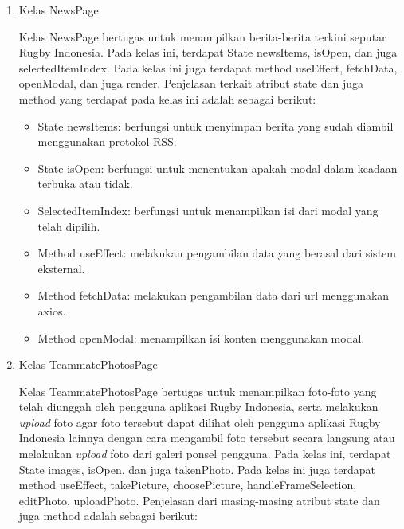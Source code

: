 \begin{enumerate}
    \item Kelas NewsPage

    Kelas NewsPage bertugas untuk menampilkan berita-berita terkini seputar Rugby Indonesia. Pada kelas ini, terdapat State newsItems, isOpen, dan juga selectedItemIndex. Pada kelas ini juga terdapat method useEffect, fetchData, openModal, dan juga render. Penjelasan terkait atribut state dan juga method yang terdapat pada kelas ini adalah sebagai berikut:

    \begin{itemize}
        \item State newsItems: berfungsi untuk menyimpan berita yang sudah diambil menggunakan protokol RSS.
        \item State isOpen: berfungsi untuk menentukan apakah modal dalam keadaan terbuka atau tidak.
        \item SelectedItemIndex: berfungsi untuk menampilkan isi dari modal yang telah dipilih.
        \item Method useEffect: melakukan pengambilan data yang berasal dari sistem eksternal.
        \item Method fetchData: melakukan pengambilan data dari url menggunakan axios.
        \item Method openModal: menampilkan isi konten menggunakan modal.
    \end{itemize}

    \item Kelas TeammatePhotosPage

    Kelas TeammatePhotosPage bertugas untuk menampilkan foto-foto yang telah diunggah oleh pengguna aplikasi Rugby Indonesia, serta melakukan \textit{upload} foto agar foto tersebut dapat dilihat oleh pengguna aplikasi Rugby Indonesia lainnya dengan cara mengambil foto tersebut secara langsung atau melakukan \textit{upload} foto dari galeri ponsel pengguna. Pada kelas ini, terdapat State images, isOpen, dan juga takenPhoto. Pada kelas ini juga terdapat method useEffect, takePicture, choosePicture, handleFrameSelection, editPhoto, uploadPhoto. Penjelasan dari masing-masing atribut state dan juga method adalah sebagai berikut:


\end{enumerate}
